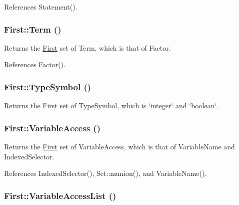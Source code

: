 References Statement().

\hypertarget{classFirst_adde0c66cf7df9688ea94bfa7eec81b27}{
\subsubsection[{Term}]{ First::Term ()}}
\label{classFirst_adde0c66cf7df9688ea94bfa7eec81b27}


Returns the \hyperlink{classFirst}{First} set of Term, which is that of Factor. 



References Factor().

\hypertarget{classFirst_aca3f9425bf421939aabc8b911fafdc65}{
\subsubsection[{TypeSymbol}]{ First::TypeSymbol ()}}
\label{classFirst_aca3f9425bf421939aabc8b911fafdc65}


Returns the \hyperlink{classFirst}{First} set of TypeSymbol, which is \char`\"{}integer\char`\"{} and \char`\"{}boolean\char`\"{}. 

\hypertarget{classFirst_af2c57bd5207f82ae122d6177eac2d1b5}{
\subsubsection[{VariableAccess}]{ First::VariableAccess ()}}
\label{classFirst_af2c57bd5207f82ae122d6177eac2d1b5}


Returns the \hyperlink{classFirst}{First} set of VariableAccess, which is that of VariableName and IndexedSelector. 



References IndexedSelector(), Set::munion(), and VariableName().

\hypertarget{classFirst_aaa47b4e29fb5ab9df531b490bc954dcd}{
\subsubsection[{VariableAccessList}]{ First::VariableAccessList ()}}
\label{classFirst_aaa47b4e29fb5ab9df531b490bc954dcd}


